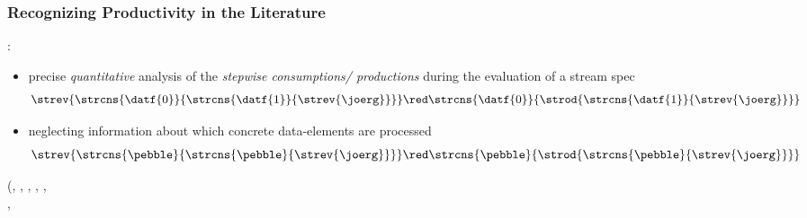 \documentclass[10pt]{beamer}
\begin{document}
\begin{frame}
\end{frame}%


\begin{frame}%
  \frametitle{Recognizing Productivity in the Literature}

    :
    \\[1ex]
    \begin{itemize}
      \item precise \emph{quantitative} analysis of the 
        \emph{stepwise consumptions/ productions}
        during the evaluation of a stream spec
        \vspace*{0.25ex}
        \begin{equation*}
          \strev{\strcns{\datf{0}}{\strcns{\datf{1}}{\strev{\joerg}}}}
            \red
          \strcns{\datf{0}}{\strod{\strcns{\datf{1}}{\strev{\joerg}}}} 
        \end{equation*}
      \item \alert{neglecting information about 
                   which concrete data-elements are processed}
        \vspace*{0.25ex}
        \begin{equation*}
          \strev{\strcns{\pebble}{\strcns{\pebble}{\strev{\joerg}}}}
            \red
           \strcns{\pebble}{\strod{\strcns{\pebble}{\strev{\joerg}}}} 
        \end{equation*}
    \end{itemize}
    (, 
     , 
     ,  
     , 
     ,\\ \hspace*{\fill}%
     ,

\end{frame}
\end{document}

